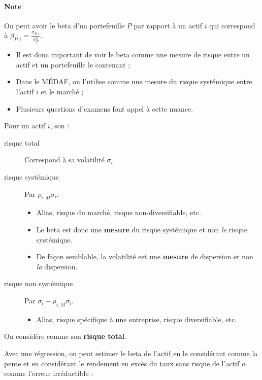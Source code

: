 \documentclass[10pt, french]{article}
\begin{document}
\begin{multicols*}{2}
\paragraph{Note}	On peut avoir le beta d'un portefeuille $P$ par rapport à un actif $i$ qui correspond à $\beta_{P, i}	=	\frac{\sigma_{P, i}}{\sigma^{2}_{P}}$.
\begin{itemize}
	\item	Il est donc important de voir le beta comme une mesure de risque entre un actif et un portefeuille le contenant ;
	\item	Dans le MÉDAF, on l'utilise comme une mesure du risque systémique entre l'actif $i$ et le marché ;
	\item	Plusieurs questions d'examens font appel à cette nuance.
\end{itemize}

\begin{definitionNOHFILLpropos}
Pour un actif $i$, son :
\begin{description}
	\item[risque total]	Correspond à sa volatilité $\sigma_{i}$.
	\item[risque systémique]	Par $\rho_{i, M} \sigma_{i}$.
		\begin{itemize}
		\item	Alias, risque du marché, risque non-diversifiable, etc.
		\item	Le beta est donc une \textbf{mesure} du risque systémique et non \textit{le} risque systémique.
		\item	De façon semblable, la volatilité est une \textbf{mesure} de dispersion et non \textit{la} dispersion.
		\end{itemize}
	\item[risque non systémique]	Par $\sigma_{i}	-	\rho_{i, M} \sigma_{i}$.
		\begin{itemize}
		\item	Alias, risque spécifique à une entreprise, risque diversifiable, etc.
		\end{itemize}
\end{description}
On considère  comme son \textbf{risque total}.
\end{definitionNOHFILLpropos}


Avec une régression, on peut estimer le beta de l'actif en le considérant comme la pente et en considérant le rendement en excès du taux sans risque de l'actif $\alpha$ comme l'erreur irréductible :
\begin{center}


\end{center}
\end{multicols*}
\end{document}
